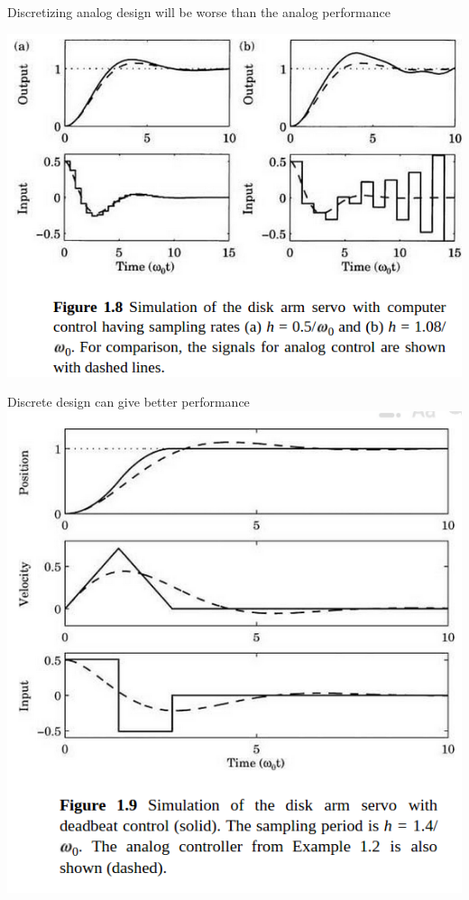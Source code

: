 \documentclass[presentation,aspectratio=169]{beamer}
\begin{document}
\begin{frame}[label={sec:org0896390}]{Discretizing analog design will be worse than the analog performance}
\begin{center}
\includegraphics[width=0.7\linewidth]{../../figures/fig1-8.png}
\end{center}
\end{frame}

\begin{frame}[label={sec:org64f2e99}]{Discrete design can give better performance}
\includegraphics[height=0.6\linewidth]{../../figures/fig1-9.png}
\end{frame}
\end{document}
